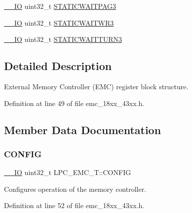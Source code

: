 \begin{DoxyCompactItemize}
\item 
\hyperlink{core__sc300_8h_aec43007d9998a0a0e01faede4133d6be}{\+\_\+\+\_\+\+IO} uint32\+\_\+t \hyperlink{struct_l_p_c___e_m_c___t_ae7bfd3776e4a6845862f6930fbfed2e6}{S\+T\+A\+T\+I\+C\+W\+A\+I\+T\+P\+A\+G3}
\item 
\hyperlink{core__sc300_8h_aec43007d9998a0a0e01faede4133d6be}{\+\_\+\+\_\+\+IO} uint32\+\_\+t \hyperlink{struct_l_p_c___e_m_c___t_ac668a732f1d73119d1b642bb2aa7315a}{S\+T\+A\+T\+I\+C\+W\+A\+I\+T\+W\+R3}
\item 
\hyperlink{core__sc300_8h_aec43007d9998a0a0e01faede4133d6be}{\+\_\+\+\_\+\+IO} uint32\+\_\+t \hyperlink{struct_l_p_c___e_m_c___t_ad2ae37d99bb9f62132a003701bf27a4b}{S\+T\+A\+T\+I\+C\+W\+A\+I\+T\+T\+U\+R\+N3}
\end{DoxyCompactItemize}


\subsection{Detailed Description}
External Memory Controller (E\+MC) register block structure. 

Definition at line 49 of file emc\+\_\+18xx\+\_\+43xx.\+h.



\subsection{Member Data Documentation}
\mbox{\label{struct_l_p_c___e_m_c___t_ab9b4e82e4deea2ab7cf2e8b705c6930a}} 
\subsubsection{\texorpdfstring{C\+O\+N\+F\+IG}{CONFIG}}
{\footnotesize\ttfamily \hyperlink{core__sc300_8h_aec43007d9998a0a0e01faede4133d6be}{\+\_\+\+\_\+\+IO} uint32\+\_\+t L\+P\+C\+\_\+\+E\+M\+C\+\_\+\+T\+::\+C\+O\+N\+F\+IG}

Configures operation of the memory controller. 

Definition at line 52 of file emc\+\_\+18xx\+\_\+43xx.\+h.

\mbox{\label{struct_l_p_c___e_m_c___t_a2d6b5e4cfddc97c3f44228a9aef1eb40}} 
